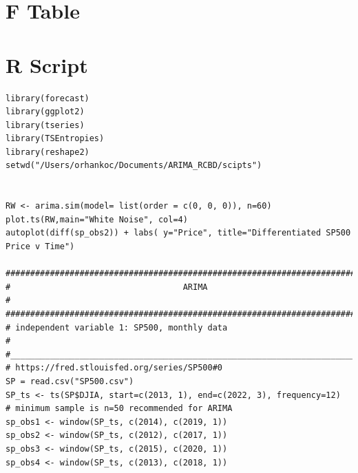 \documentclass{article}[12pt]
\begin{document}
            \begin{appendices}
                \section{F Table}
                \label{appendix:f_table}
                \begin{figure}[htbp]
                    \end{figure}    

                \section{R Script}
                \begin{lstlisting}
library(forecast)
library(ggplot2)
library(tseries)
library(TSEntropies)
library(reshape2)
setwd("/Users/orhankoc/Documents/ARIMA_RCBD/scipts")


RW <- arima.sim(model= list(order = c(0, 0, 0)), n=60)
plot.ts(RW,main="White Noise", col=4)
autoplot(diff(sp_obs2)) + labs( y="Price", title="Differentiated SP500 Price v Time")

################################################################################
#                                   ARIMA                                      #
################################################################################
# independent variable 1: SP500, monthly data                                  #
#______________________________________________________________________________#
# https://fred.stlouisfed.org/series/SP500#0
SP = read.csv("SP500.csv")
SP_ts <- ts(SP$DJIA, start=c(2013, 1), end=c(2022, 3), frequency=12)
# minimum sample is n=50 recommended for ARIMA
sp_obs1 <- window(SP_ts, c(2014), c(2019, 1))
sp_obs2 <- window(SP_ts, c(2012), c(2017, 1))
sp_obs3 <- window(SP_ts, c(2015), c(2020, 1))
sp_obs4 <- window(SP_ts, c(2013), c(2018, 1))


\end{lstlisting}
\end{appendices}
\end{document}
